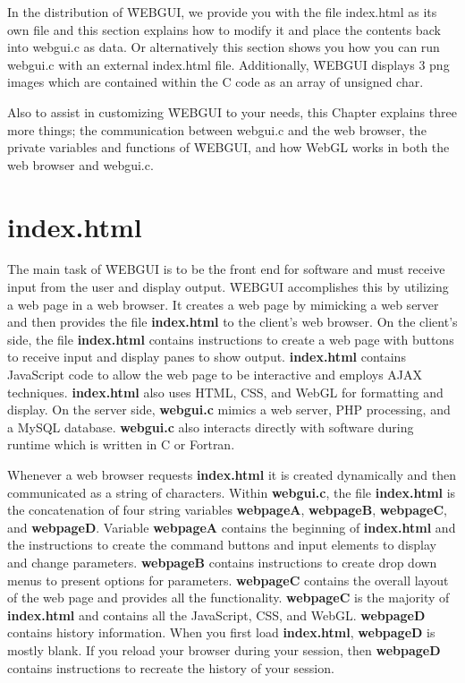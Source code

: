 In the distribution of \f{WEBGUI}, we provide you with the file index.html as its own file and this section
explains how to modify it and place the contents back into webgui.c as data. Or alternatively this section
shows you how you can run webgui.c with an external index.html file. Additionally, \f{WEBGUI} displays
3 png images which are contained within the C code as an array of unsigned char.

Also to assist in customizing \f{WEBGUI} to your needs, this Chapter explains three more things; the 
communication between webgui.c and the web browser,  the private variables and functions of \f{WEBGUI}, 
and how WebGL works in both the web browser and webgui.c.

\section{index.html}
\label{sec:7-4}
The main task of \f{WEBGUI} is to be the front end for software and must receive input from the user and display output.
\f{WEBGUI} accomplishes this by utilizing a web page in a web browser. It creates a web page by mimicking a web server 
and then provides the file \textbf{index.html} to the client's web browser. On the client's side, the file \textbf{index.html} contains 
instructions to create a web page with buttons to receive input and display panes to show output. \textbf{index.html} contains
JavaScript code to allow the web page to be interactive and employs AJAX techniques. \textbf{index.html} also uses
HTML, CSS, and WebGL for formatting and display. On the server side, \textbf{webgui.c} mimics a web server, PHP processing,
and a MySQL database. \textbf{webgui.c} also interacts directly with software during runtime which 
is written in C or Fortran.

Whenever a web browser requests \textbf{index.html} it is created dynamically and then communicated as a string of characters. 
Within \textbf{webgui.c}, the file \textbf{index.html} is the concatenation of four string variables \textbf{webpageA}, \textbf{webpageB}, 
\textbf{webpageC}, and \textbf{webpageD}. Variable \textbf{webpageA} contains the beginning of \textbf{index.html} and the 
instructions to create the command buttons and input elements
to display and change parameters. \textbf{webpageB} contains instructions to create drop down menus to present options
for parameters. \textbf{webpageC} contains the overall layout of the web page and provides all the functionality. \textbf{webpageC}
is the majority of \textbf{index.html} and contains all the JavaScript, CSS, and WebGL. \textbf{webpageD} contains history information.
When you first load \textbf{index.html}, \textbf{webpageD} is mostly blank. If you reload your browser during your session,
then \textbf{webpageD} contains instructions to recreate the history of your session.

